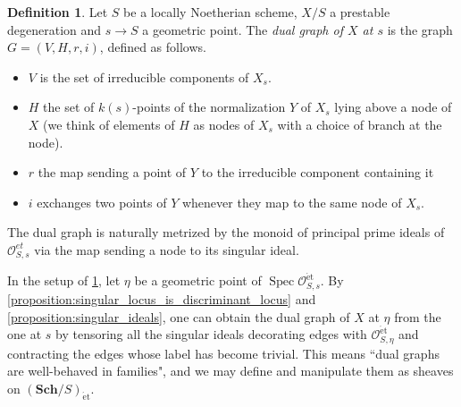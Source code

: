 \documentclass[a4paper,12pt]{amsart} %
\numberwithin{equation}{subsection}
\newcommand{\Schet}[1]{(\cat{Sch}/#1)_\et}
\newcommand{\bd}[1]{{\mathbf{#1}}}
\newcommand{\cat}[1]{\bd{#1}}
\def\et{\mathrm{\acute{e}t}}
\newcommand{\Spec}{\operatorname{Spec}}
\theoremstyle{definition}
\newtheorem{definition}{Definition}[section]
\theoremstyle{plain}%
\theoremstyle{remark}
\renewcommand{\O}{\mathcal{O}}
\begin{document}
\begin{definition}\label{definition:dual_graph_at_point}
	Let $S$ be a locally Noetherian scheme, $X/S$ a prestable degeneration and $s \to S$ a geometric point. The \emph{dual graph of $X$ at $s$} is the graph $G=(V,H,r,i)$, defined as follows.
	\begin{itemize}
		\item $V$ is the set of irreducible components of $X_s$.
		\item $H$ the set of $k(s)$-points of the normalization $Y$ of $X_s$ lying above a node of $X$ (we think of elements of $H$ as nodes of $X_s$ with a choice of branch at the node).
		\item $r$ the map sending a point of $Y$ to the irreducible component containing it
		\item $i$ exchanges two points of $Y$ whenever they map to the same node of $X_s$.
	\end{itemize}
The dual graph is naturally metrized by the monoid of principal prime ideals of $\O_{S,s}^{et}$ via the map sending a node to its singular ideal.
\end{definition}

In the setup of \ref{definition:dual_graph_at_point}, let $\eta$ be a geometric point of $\Spec\O_{S,s}^{\et}$. By \ref{proposition:singular_locus_is_discriminant_locus} and \ref{proposition:singular_ideals}, one can obtain the dual graph of $X$ at $\eta$ from the one at $s$ by tensoring all the singular ideals decorating edges with $\O_{S,\eta}^{\et}$ and contracting the edges whose label has become trivial. This means ``dual graphs are well-behaved in families", and we may define and manipulate them as sheaves on $\Schet{S}$.
\end{document}
